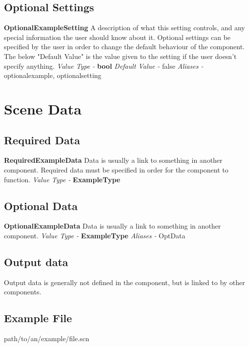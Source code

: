 \documentclass{article}
\newenvironment{componentoption}[1]%
{\textbf{#1}\newline}
{\newline}
\newcommand{\aliases}[1] {\newline \textit{Aliases - } #1}
\newcommand{\defaultvalue}[1] {\newline \textit{Default Value - } #1}
\newcommand{\valuetype}[1] {\newline \textit{Value Type - } \textbf{#1}}
\begin{document}
\subsection{Optional Settings}

\begin{componentoption}{OptionalExampleSetting}
A description of what this setting controls, and any special information the user should know about it. Optional settings can be specified by the user in order to change the default behaviour of the component. The below "Default Value" is the value given to the setting if the user doesn't specify anything.
\valuetype{bool}
\defaultvalue{false}
\aliases{optionalexample, optionalsetting}
\end{componentoption}

\section{Scene Data}

\subsection{Required Data}

\begin{componentoption}{RequiredExampleData}
Data is usually a link to something in another component. Required data must be specified in order for the component to function.
\valuetype{ExampleType}
\end{componentoption}

\subsection{Optional Data}

\begin{componentoption}{OptionalExampleData}
Data is usually a link to something in another component.
\valuetype{ExampleType}
\aliases{OptData}
\end{componentoption}

\subsection{Output data}
Output data is generally not defined in the component, but is linked to by other components.

\subsection{Example File}
path/to/an/example/file.scn
\end{document}

